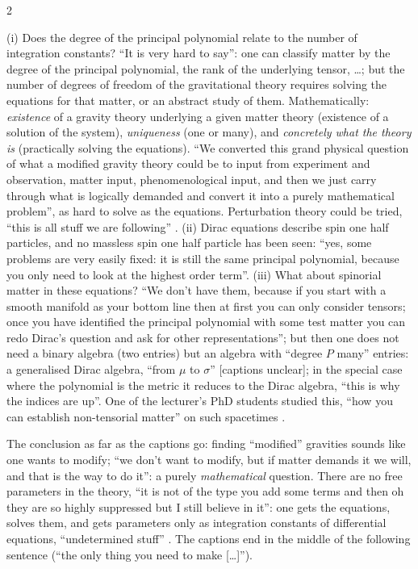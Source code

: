 \begin{paracol}{2}
\begin{coursenote}
(i) Does the degree of the principal polynomial relate to the number of integration constants? ``It is very hard to say'': one can classify matter by the degree of the principal polynomial, the rank of the underlying tensor, \dots; but the number of degrees of freedom of the gravitational theory requires solving the equations for that matter, or an abstract study of them. Mathematically: \emph{existence} of a gravity theory underlying a given matter theory (existence of a solution of the system), \emph{uniqueness} (one or many), and \emph{concretely what the theory is} (practically solving the equations). ``We converted this grand physical question of what a modified gravity theory could be to input from experiment and observation, matter input, phenomenological input, and then we just carry through what is logically demanded and convert it into a purely mathematical problem'', as hard to solve as the equations. Perturbation theory could be tried, ``this is all stuff we are following'' .
(ii) Dirac equations describe spin one half particles, and no massless spin one half particle has been seen: ``yes, some problems are very easily fixed: it is still the same principal polynomial, because you only need to look at the highest order term''. (iii) What about spinorial matter in these equations? ``We don't have them, because if you start with a smooth manifold as your bottom line then at first you can only consider tensors; once you have identified the principal polynomial with some test matter you can redo Dirac's question and ask for other representations''; but then one does not need a binary algebra (two entries) but an algebra with ``degree $P$ many'' entries: a generalised Dirac algebra, ``from $\mu$ to $\sigma$'' [captions unclear]; in the special case where the polynomial is the metric it reduces to the Dirac algebra, ``this is why the indices are up''. One of the lecturer's PhD students studied this, ``how you can establish non-tensorial matter'' on such spacetimes .
\end{coursenote}

The conclusion as far as the captions go: finding ``modified'' gravities sounds like one wants to modify; ``we don't want to modify, but if matter demands it we will, and that is the way to do it'': a purely \emph{mathematical} question. There are no free parameters in the theory, ``it is not of the type you add some terms and then oh they are so highly suppressed but I still believe in it'': one gets the equations, solves them, and gets parameters only as integration constants of differential equations, ``undetermined stuff'' . The captions end in the middle of the following sentence (``the only thing you need to make [\dots]'').


\end{paracol}
